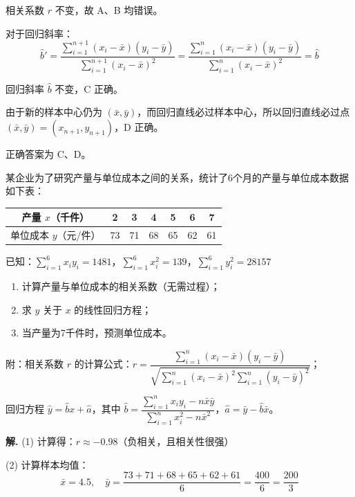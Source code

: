 \documentclass[11pt]{ctexrep}
\begin{document}
相关系数 $r$ 不变，故 A、B 均错误。

对于回归斜率：
\[
\hat{b}' = \frac{\sum_{i=1}^{n+1}(x_i - \bar{x})(y_i - \bar{y})}{\sum_{i=1}^{n+1}(x_i - \bar{x})^2} = \frac{\sum_{i=1}^{n}(x_i - \bar{x})(y_i - \bar{y})}{\sum_{i=1}^{n}(x_i - \bar{x})^2} = \hat{b}
\]

回归斜率 $\hat{b}$ 不变，C 正确。

由于新的样本中心仍为 $(\bar{x}, \bar{y})$，而回归直线必过样本中心，所以回归直线必过点 $(\bar{x}, \bar{y}) = (x_{n+1}, y_{n+1})$，D 正确。

正确答案为 C、D。

\begin{realexam}[2026 奉贤二模]
    某企业为了研究产量与单位成本之间的关系，统计了6个月的产量与单位成本数据如下表：

    \begin{center}
    \begin{tabular}{c|cccccc}
    \hline
    产量 $x$（千件） & 2 & 3 & 4 & 5 & 6 & 7 \\
    \hline
    单位成本 $y$（元/件） & 73 & 71 & 68 & 65 & 62 & 61 \\
    \hline
    \end{tabular}
    \end{center}

    已知：$\sum_{i=1}^{6}x_i y_i = 1481$，$\sum_{i=1}^{6}x_i^2 = 139$，$\sum_{i=1}^{6}y_i^2 = 28157$

    \begin{enumerate}
        \item 计算产量与单位成本的相关系数（无需过程）；
        \item 求 $y$ 关于 $x$ 的线性回归方程；
        \item 当产量为7千件时，预测单位成本。
    \end{enumerate}

    附：相关系数 $r$ 的计算公式：$r = \dfrac{\sum_{i=1}^{n}(x_i - \bar{x})(y_i - \bar{y})}{\sqrt{\sum_{i=1}^{n}(x_i - \bar{x})^2 \sum_{i=1}^{n}(y_i - \bar{y})^2}}$；

    回归方程 $\hat{y} = \hat{b}x + \hat{a}$，其中 $\hat{b} = \dfrac{\sum_{i=1}^{n}x_i y_i - n\bar{x}\bar{y}}{\sum_{i=1}^{n}x_i^2 - n\bar{x}^2}$，$\hat{a} = \bar{y} - \hat{b}\bar{x}$。
\end{realexam}

\textbf{解.} (1) 计算得：$r \approx -0.98$（负相关，且相关性很强）

(2) 计算样本均值：
\[
\bar{x} = 4.5, \quad \bar{y} = \frac{73+71+68+65+62+61}{6} = \frac{400}{6} = \frac{200}{3}
\]
\end{document}
